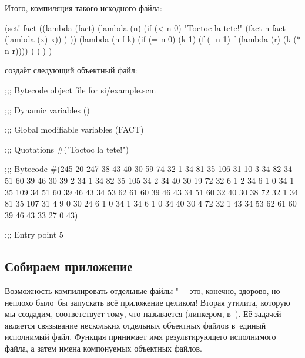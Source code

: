 Итого, компиляция такого исходного файла:

\begin{code:lisp-framed}[title={\snippet{si/example.scm}}]
(set! fact
      ((lambda (fact) (lambda (n)
                        (if (< n 0)
                            "Toctoc la tete!"
                            (fact n fact (lambda (x) x)) ) ))
       (lambda (n f k)
         (if (= n 0)
             (k 1)
             (f (- n 1) f (lambda (r) (k (* n r)))) ) ) ) )
\end{code:lisp-framed}\medskip

\noindent
создаёт следующий объектный файл:

\begin{code:lisp-framed}[title={\snippet{si/example.so}}]
;;; Bytecode object file for si/example.scm

;;; Dynamic variables
()

;;; Global modifiable variables
(FACT)

;;; Quotations
#("Toctoc la tete!")

;;; Bytecode
#(245 20 247 38 43 40 30 59 74 32 1 34 81 35 106 31 10 3 34 82 34 51
  60 39 46 30 39 2 34 1 34 82 35 105 34 2 34 40 30 19 72 32 6 1 2 34
  6 1 0 34 1 35 109 34 51 60 39 46 43 34 53 62 61 60 39 46 43 34 51
  60 32 40 30 38 72 32 1 34 81 35 107 31 4 9 0 30 24 6 1 0 34 1 34 6
  1 0 34 40 30 4 72 32 1 43 34 53 62 61 60 39 46 43 33 27 0 43)

;;; Entry point
5
\end{code:lisp-framed}


\subsection{Собираем приложение}\label{compilation/separate/ssect:build}

Возможность компилировать отдельные файлы "--- это, конечно, здорово, но неплохо
было~бы запускать всё приложение целиком! Вторая утилита, которую мы создадим,
соответствует тому, что называется  (линкером, 
в~\UNIX). Её задачей является связывание нескольких отдельных объектных файлов
в~единый исполнимый файл. Функция  принимает имя
результирующего исполнимого файла, а затем имена компонуемых объектных файлов.

